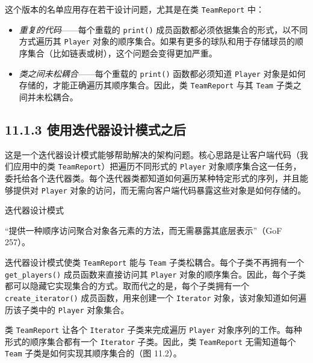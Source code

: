 
这个版本的名单应用存在若干设计问题，尤其是在类 \texttt{Team\allowbreak{}Report} 中：

\begin{itemize}
\item \emph{重复的代码}——每个重载的 \texttt{print()} 成员函数都必须依据集合的形式，以不同方式遍历其 \texttt{Player} 对象的顺序集合。如果有更多的球队和用于存储球员的顺序集合（比如链表或树），这个问题会变得更加严重。
\item \emph{类之间未松耦合}——每个重载的 \texttt{print()} 函数都必须知道 \texttt{Player} 对象是如何存储的，才能正确遍历其顺序集合。因此，类 \texttt{Team\allowbreak{}Report} 与其 \texttt{Team} 子类之间并未松耦合。
\end{itemize}

\subsection{11.1.3 使用迭代器设计模式之后}

这是一个迭代器设计模式能够帮助解决的架构问题。核心思路是让客户端代码（我们应用中的类 \texttt{Team\allowbreak{}Report}）把遍历不同形式的 \texttt{Player} 对象顺序集合这一任务，委托给各个迭代器类。每个迭代器类都知道如何遍历某种特定形式的序列，并且能够提供对 \texttt{Player} 对象的访问，而无需向客户端代码暴露这些对象是如何存储的。

\begin{mySidebar}{迭代器设计模式}

“提供一种顺序访问聚合对象各元素的方法，而无需暴露其底层表示”（GoF 257）。
\end{mySidebar}

迭代器设计模式使类 \texttt{Team\allowbreak{}Report} 能与 \texttt{Team} 子类松耦合。每个子类不再拥有一个 \texttt{ge}\texttt{t}\texttt{\_}\texttt{players()} 成员函数来直接访问其 \texttt{Player} 对象的顺序集合。因此，每个子类都可以隐藏它实现集合的方式。取而代之的是，每个子类拥有一个 \texttt{create\_\allowbreak{}iterator(\allowbreak{})\allowbreak{}} 成员函数，用来创建一个 \texttt{Iterator} 对象，该对象知道如何遍历该子类中的 \texttt{Player} 对象集合。

类 \texttt{Team\allowbreak{}Report} 让各个 \texttt{Iterator} 子类来完成遍历 \texttt{Player} 对象序列的工作。每种形式的顺序集合都有一个 \texttt{Iterator} 子类。因此，类 \texttt{Team\allowbreak{}Report} 无需知道每个 \texttt{Team} 子类是如何实现其顺序集合的（图 11.2）。


